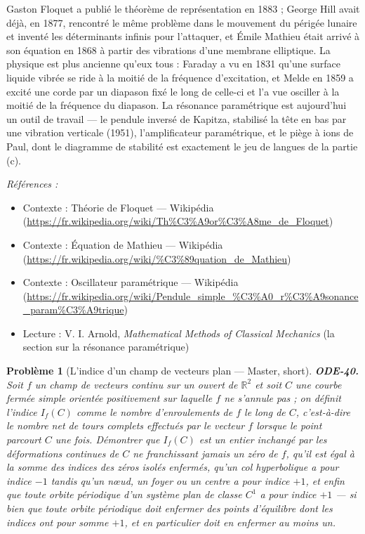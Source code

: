 \documentclass[11pt]{article}
\newtheorem{problem}{Problème}
\newenvironment{refs}{\par\small\noindent\emph{Références :}\begin{itemize}\setlength\itemsep{0pt}}{\end{itemize}\normalsize}
\begin{document}
\noindent Gaston Floquet a publié le théorème de représentation en 1883 ; George Hill
avait déjà, en 1877, rencontré le même problème dans le mouvement du périgée lunaire et inventé
les déterminants infinis pour l'attaquer, et Émile Mathieu était arrivé à son équation en 1868 à
partir des vibrations d'une membrane elliptique. La physique est plus ancienne qu'eux tous :
Faraday a vu en 1831 qu'une surface liquide vibrée se ride à la moitié de la fréquence
d'excitation, et Melde en 1859 a excité une corde par un diapason fixé le long de celle-ci et l'a
vue osciller à la moitié de la fréquence du diapason. La résonance paramétrique est aujourd'hui
un outil de travail --- le pendule inversé de Kapitza, stabilisé la tête en bas par une vibration
verticale (1951), l'amplificateur paramétrique, et le piège à ions de Paul, dont le diagramme de
stabilité est exactement le jeu de langues de la partie (c).

\begin{refs}
\item Contexte : Théorie de Floquet --- Wikipédia (\url{https://fr.wikipedia.org/wiki/Th%C3%A9or%C3%A8me_de_Floquet})
\item Contexte : Équation de Mathieu --- Wikipédia (\url{https://fr.wikipedia.org/wiki/%C3%89quation_de_Mathieu})
\item Contexte : Oscillateur paramétrique --- Wikipédia (\url{https://fr.wikipedia.org/wiki/Pendule_simple_%C3%A0_r%C3%A9sonance_param%C3%A9trique})
\item Lecture : V. I. Arnold, \textit{Mathematical Methods of Classical Mechanics} (la section sur la résonance paramétrique)
\end{refs}

\bigskip

\begin{problem}[{L'indice d'un champ de vecteurs plan --- Master, short}]
\textbf{ODE-40.} Soit $ f $ un champ de vecteurs continu sur un ouvert de
$ \mathbb{R}^2 $ et soit $ C $ une courbe fermée simple orientée positivement sur laquelle
$ f $ ne s'annule pas ; on définit l'indice $ I_f(C) $ comme le nombre d'enroulements de
$ f $ le long de $ C $, c'est-à-dire le nombre net de tours complets effectués par le vecteur
$ f $ lorsque le point parcourt $ C $ une fois. Démontrer que $ I_f(C) $ est un entier
inchangé par les déformations continues de $ C $ ne franchissant jamais un zéro de $ f $,
qu'il est égal à la somme des indices des zéros isolés enfermés, qu'un col hyperbolique a pour
indice $ -1 $ tandis qu'un n\oe{}ud, un foyer ou un centre a pour indice $ +1 $, et enfin que
toute orbite périodique d'un système plan de classe $ C^1 $ a pour indice $ +1 $ --- si bien que
toute orbite périodique doit enfermer des points d'équilibre dont les indices ont pour somme
$ +1 $, et en particulier doit en enfermer au moins un.
\end{problem}
\end{document}
